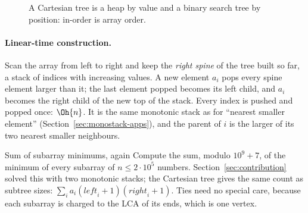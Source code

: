 \begin{figure}[htbp]
\centering
{}
\caption{A Cartesian tree is a heap by value and a binary search tree by position: in-order is array order.}
\label{fig:cartesian}
\end{figure}

\paragraph{Linear-time construction.} Scan the array from left to right and keep the \emph{right spine} of the tree built so far, a
stack of indices with increasing values. A new element $a_i$ pops every spine element larger than it; the last element popped becomes
its left child, and $a_i$ becomes the right child of the new top of the stack. Every index is pushed and popped once: $\Oh{n}$. It is
the same monotonic stack as for ``nearest smaller element'' (Section~\ref{sec:monostack-apps}), and the parent of $i$ is the larger
of its two nearest smaller neighbours.

\begin{problem}{Sum of subarray minimums, again}
Compute the sum, modulo $10^9 + 7$, of the minimum of every subarray of $n \le 2 \cdot 10^5$ numbers.
\solution Section~\ref{sec:contribution} solved this with two monotonic stacks; the Cartesian tree gives the same count as subtree
sizes: $\sum_i a_i (\mathit{left}_i + 1)(\mathit{right}_i + 1)$. Ties need no special care, because each subarray is charged to the LCA
of its ends, which is one vertex.
\end{problem}


